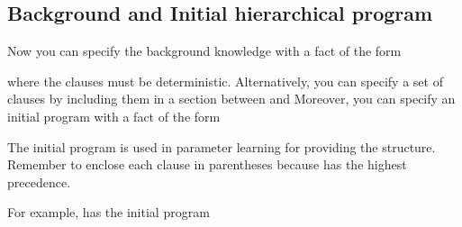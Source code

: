 \documentclass[letterpaper,10pt,english]{sphinxmanual}
\begin{document}
\subsection{Background and Initial hierarchical program}
\label{\detokenize{index:background-and-initial-hierarchical-program}}
Now you can specify the background knowledge with a fact of the form

\begin{sphinxVerbatim}[commandchars=\\\{\}]
    
\end{sphinxVerbatim}

where the clauses must be deterministic.
Alternatively, you can specify a set of clauses by including them in a section between  and 
Moreover, you can specify an initial program with a fact of the form

\begin{sphinxVerbatim}[commandchars=\\\{\}]
    
\end{sphinxVerbatim}

The initial program is used in parameter learning for providing the structure.
Remember to enclose each clause in parentheses because \sphinxcode{\sphinxupquote{:-}} has the highest precedence.

For example,  has the initial program

\begin{sphinxVerbatim}[commandchars=\\\{\}]
\PYG{p}{[} 
 
 
   \PYG{p}{]}
\end{sphinxVerbatim}
\end{document}
